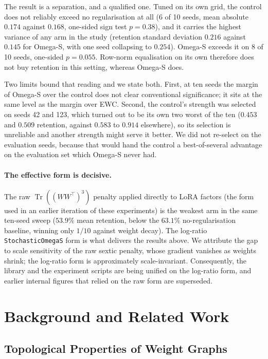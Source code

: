 \documentclass[11pt,a4paper]{article}
\begin{document}
The result is a separation, and a qualified one. Tuned on its own grid, the
control does not reliably exceed no regularisation at all (6 of 10 seeds, mean
absolute $0.174$ against $0.168$, one-sided sign test $p=0.38$), and it carries
the highest variance of any arm in the study (retention standard deviation
$0.216$ against $0.145$ for Omega-S, with one seed collapsing to $0.254$).
Omega-S exceeds it on 8 of 10 seeds, one-sided $p=0.055$. Row-norm equalisation
on its own therefore does not buy retention in this setting, whereas Omega-S
does.

Two limits bound that reading and we state both. First, at ten seeds the margin
of Omega-S over the control does not clear conventional significance; it sits
at the same level as the margin over EWC. Second, the control's strength was
selected on seeds 42 and 123, which turned out to be its own two worst of the
ten ($0.453$ and $0.509$ retention, against $0.583$ to $0.914$ elsewhere), so
its selection is unreliable and another strength might serve it better. We did
not re-select on the evaluation seeds, because that would hand the control a
best-of-several advantage on the evaluation set which Omega-S never had.

\paragraph{The effective form is decisive.}
The raw $\operatorname{Tr}((WW^\top)^3)$ penalty applied directly to LoRA
factors (the form used in an earlier iteration of these experiments) is
the weakest arm in the same ten-seed sweep ($53.9\%$ mean retention, below
the $63.1\%$ no-regularisation baseline, winning only $1/10$ against weight
decay). The log-ratio \texttt{StochasticOmegaS} form is what delivers the
results above. We attribute the gap to scale sensitivity of the raw sextic
penalty, whose gradient vanishes as weights shrink; the log-ratio form is
approximately scale-invariant. Consequently, the library and the experiment
scripts are being unified on the log-ratio form, and earlier internal
figures that relied on the raw form are superseded.


\section{Background and Related Work}

\subsection{Topological Properties of Weight Graphs}
\end{document}
